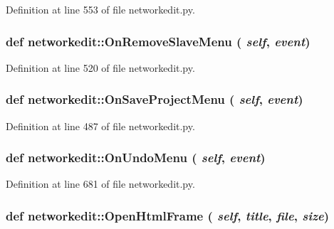 Definition at line 553 of file networkedit.py.\hypertarget{namespacenetworkedit_3c3acc2994f8e2230cef333585c6354f}{
\subsubsection[OnRemoveSlaveMenu]{\setlength{\rightskip}{0pt plus 5cm}def networkedit::On\-Remove\-Slave\-Menu ( {\em self},  {\em event})}}
\label{namespacenetworkedit_3c3acc2994f8e2230cef333585c6354f}




Definition at line 520 of file networkedit.py.\hypertarget{namespacenetworkedit_38a5bbe86087f2d696bcd53f922d6450}{
\subsubsection[OnSaveProjectMenu]{\setlength{\rightskip}{0pt plus 5cm}def networkedit::On\-Save\-Project\-Menu ( {\em self},  {\em event})}}
\label{namespacenetworkedit_38a5bbe86087f2d696bcd53f922d6450}




Definition at line 487 of file networkedit.py.\hypertarget{namespacenetworkedit_f5979f3a6d283393fb5a68ab22934abb}{
\subsubsection[OnUndoMenu]{\setlength{\rightskip}{0pt plus 5cm}def networkedit::On\-Undo\-Menu ( {\em self},  {\em event})}}
\label{namespacenetworkedit_f5979f3a6d283393fb5a68ab22934abb}




Definition at line 681 of file networkedit.py.\hypertarget{namespacenetworkedit_0acd7681be496b4948ad18897ea13ac4}{
\subsubsection[OpenHtmlFrame]{\setlength{\rightskip}{0pt plus 5cm}def networkedit::Open\-Html\-Frame ( {\em self},  {\em title},  {\em file},  {\em size})}}
\label{namespacenetworkedit_0acd7681be496b4948ad18897ea13ac4}




